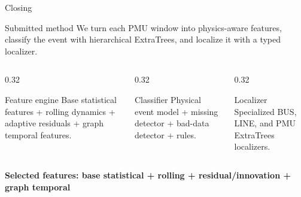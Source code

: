 \documentclass[aspectratio=169,10pt,t]{beamer}
\begin{document}
\begin{frame}{Closing}
\small
\begin{block}{Submitted method}
We turn each PMU window into physics-aware features, classify the event with hierarchical ExtraTrees, and localize it with a typed localizer.
\end{block}
\begin{columns}[T,totalwidth=\textwidth]
\begin{column}{0.32\textwidth}
\begin{exampleblock}{Feature engine}
Base statistical features + rolling dynamics + adaptive residuals + graph temporal features.
\end{exampleblock}
\end{column}
\begin{column}{0.32\textwidth}
\begin{exampleblock}{Classifier}
Physical event model + missing detector + bad-data detector + rules.
\end{exampleblock}
\end{column}
\begin{column}{0.32\textwidth}
\begin{exampleblock}{Localizer}
Specialized BUS, LINE, and PMU ExtraTrees localizers.
\end{exampleblock}
\end{column}
\end{columns}
\vspace{3mm}
\centering
{\Large\bfseries Selected features: base statistical + rolling + residual/innovation + graph temporal}
\end{frame}
\end{document}

